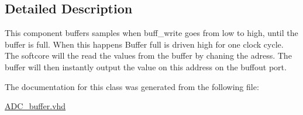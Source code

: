 \subsection{Detailed Description}
This component buffers samples when buff\-\_\-write goes from low to high, until the buffer is full. When this happens Buffer full is driven high for one clock cycle. The softcore will the read the values from the buffer by chaning the adress. The buffer will then instantly output the value on this address on the buffout port. 

The documentation for this class was generated from the following file\-:\begin{DoxyCompactItemize}
\item 
\hyperlink{ADC__buffer_8vhd}{A\-D\-C\-\_\-buffer.\-vhd}\end{DoxyCompactItemize}
